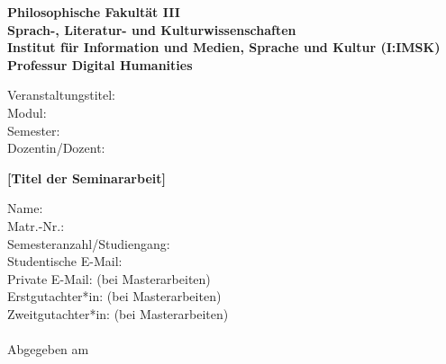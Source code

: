 \begin{titlepage}
    \noindent
    {\normalsize\bfseries Philosophische Fakultät III\\
    Sprach-, Literatur- und Kulturwissenschaften\\
    Institut für Information und Medien, Sprache und Kultur (I:IMSK)\\
    Professur Digital Humanities\par}
    \noindent\hrulefill %
    
    \vspace{5mm} %
    \noindent
    {\normalsize
    Veranstaltungstitel:\\
    Modul:\\
    Semester:\\
    Dozentin/Dozent:\\
    }
    
    \vspace{40mm} %
    \begin{center}
        {\Large\bfseries [Titel der Seminararbeit]\par}
    \end{center}
    
    \vfill %
    
    \noindent
    {\normalsize
    Name:\\
    Matr.-Nr.:\\
    Semesteranzahl/Studiengang:\\
    Studentische E-Mail:\\
    Private E-Mail: (bei Masterarbeiten)\\
    Erstgutachter*in: (bei Masterarbeiten)\\
    Zweitgutachter*in: (bei Masterarbeiten)\\
    }
    \\
    Abgegeben am

\end{titlepage}
    
